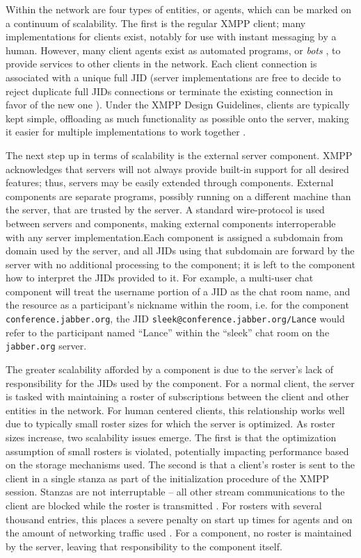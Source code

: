 Within the network are four types of entities, or agents, which can be marked
on a continuum of scalability. The first is the regular XMPP client; many
implementations for clients exist, notably for use with instant messaging by a
human. However, many client agents exist as automated programs, or \textit{bots}
\cite{XMPP-Bots}, to provide services to other clients in the network. Each
client connection is associated with a unique full JID (server implementations
are free to decide to reject duplicate full JIDs connections or terminate the
existing connection in favor of the new one \cite{XMPP-JID-Conflict}). Under
the XMPP Design Guidelines, clients are typically kept simple, offloading as
much functionality as possible onto the server, making it easier for multiple
implementations to work together \cite{XEP-0134}.

The next step up in terms of scalability is the external server component.
XMPP acknowledges that servers will not always provide built-in support
for all desired features; thus, servers may be easily extended through
components. External components are separate programs, possibly running on a
different machine than the server, that are trusted by the server. A standard
wire-protocol is used between servers and components, making external components
interroperable with any server implementation.Each component is assigned a
subdomain from domain used by the server, and all JIDs using that subdomain
are forward by the server with no additional processing to the component;
it is left to the component how to interpret the JIDs provided to it. For
example, a multi-user chat component will treat the username portion of a JID
as the chat room name, and the resource as a participant's nickname within
the room, i.e. for the component \texttt{conference.jabber.org}, the JID
\texttt{sleek@conference.jabber.org/Lance} would refer to the participant named
``Lance'' within the ``sleek'' chat room on the \texttt{jabber.org} server.

The greater scalability afforded by a component is due to the server's lack
of responsibility for the JIDs used by the component. For a normal client,
the server is tasked with maintaining a roster of subscriptions between the
client and other entities in the network. For human centered clients, this
relationship works well due to typically small roster sizes for which the
server is optimized. As roster sizes increase, two scalability issues emerge.
The first is that the optimization assumption of small rosters is violated,
potentially impacting performance based on the storage mechanisms used. The
second is that a client's roster is sent to the client in a single stanza as
part of the initialization procedure of the XMPP session. Stanzas are not
interruptable -- all other stream communications to the client are blocked while
the roster is transmitted \cite{XMPP-Interruptable}. For rosters with several
thousand entries, this places a severe penalty on start up times for agents and
on the amount of networking traffic used \cite{XMPP-Component-Scaling}. For a
component, no roster is maintained by the server, leaving that responsibility to
the component itself.

